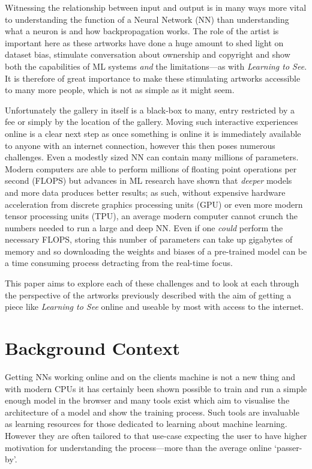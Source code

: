 \documentclass{article}
\begin{document}
Witnessing the relationship between input and output is in many ways more vital to understanding the function of a Neural Network (NN) than understanding what a neuron is and how backpropagation works. The role of the artist is important here as these artworks have done a huge amount to shed light on dataset bias\cite{crawford_paglen_2019}, stimulate conversation about ownership and copyright\cite{romano_2016} and show both the capabilities of ML systems \textit{and} the limitations---as with \textit{Learning to See}. It is therefore of great importance to make these stimulating artworks accessible to many more people, which is not as simple as it might seem.

Unfortunately the gallery in itself is a black-box to many, entry restricted by a fee or simply by the location of the gallery. Moving such interactive experiences online is a clear next step as once something is online it is immediately available to anyone with an internet connection, however this then poses numerous challenges. Even a modestly sized NN can contain many millions of parameters. Modern computers are able to perform millions of floating point operations per second (FLOPS) but advances in ML research have shown that \textit{deeper} models and more data produces better results\cite{2005.14165}; as such, without expensive hardware acceleration from discrete graphics processing units (GPU) or even more modern tensor processing units (TPU), an average modern computer cannot crunch the numbers needed to run a large and deep NN\@. Even if one \textit{could} perform the necessary FLOPS, storing this number of parameters can take up gigabytes of memory and so downloading the weights and biases of a pre-trained model can be a time consuming process detracting from the real-time focus.

This paper aims to explore each of these challenges and to look at each through the perspective of the artworks previously described with the aim of getting a piece like \textit{Learning to See} online and useable by most with access to the internet.


\section{Background Context}

Getting NNs working online and on the clients machine is not a new thing and with modern CPUs it has certainly been shown possible to train and run a simple enough model in the browser\cite{karparthy_conjs_2016, brainjs, synaptic, mind, kerasjs} and many tools exist which aim to visualise the architecture of a model and show the training process\cite{broad_cnn_vis_2016, tensorflow_playground, 1704.01942}. Such tools are invaluable as learning resources for those dedicated to learning about machine learning. However they are often tailored to that use-case expecting the user to have higher motivation for understanding the process---more than the average online `passer-by'.
\end{document}

